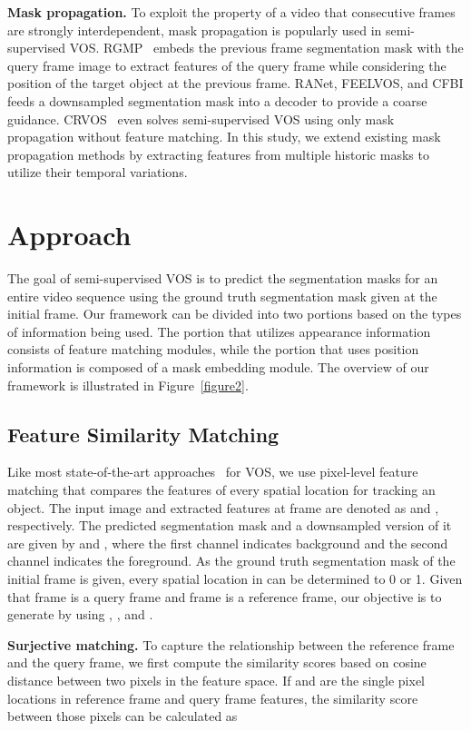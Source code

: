 \documentclass[10pt,twocolumn,letterpaper]{article}
\begin{document}
	
	\vspace{1mm}
	\noindent\textbf{Mask propagation.} To exploit the property of a video that consecutive frames are strongly interdependent, mask propagation is popularly used in semi-supervised VOS. RGMP~\cite{RGMP} embeds the previous frame segmentation mask with the query frame image to extract features of the query frame while considering the position of the target object at the previous frame. RANet, FEELVOS, and CFBI feeds a downsampled segmentation mask into a decoder to provide a coarse guidance. CRVOS~\cite{CRVOS} even solves semi-supervised VOS using only mask propagation without feature matching. In this study, we extend existing mask propagation methods by extracting features from multiple historic masks to utilize their temporal variations. 
	
	
	\section{Approach}
	The goal of semi-supervised VOS is to predict the segmentation masks for an entire video sequence using the ground truth segmentation mask given at the initial frame. Our framework can be divided into two portions based on the types of information being used. The portion that utilizes appearance information consists of feature matching modules, while the portion that uses position information is composed of a mask embedding module. The overview of our framework is illustrated in Figure~\ref{figure2}.
	
	
	\subsection{Feature Similarity Matching}
	\label{feature matching}
	Like most state-of-the-art approaches~\cite{RMNet, LCM, GIEL, SSTVOS} for VOS, we use pixel-level feature matching that compares the features of every spatial location for tracking an object. The input image and extracted features at frame  are denoted as  and , respectively. The predicted segmentation mask and a downsampled version of it are given by  and , where the first channel indicates background and the second channel indicates the foreground. As the ground truth segmentation mask of the initial frame is given, every spatial location in  can be determined to 0 or 1. Given that frame  is a query frame and frame  is a reference frame, our objective is to generate  by using , , and .
	
	\vspace{1mm}
	\noindent\textbf{Surjective matching.} To capture the relationship between the reference frame and the query frame, we first compute the similarity scores based on cosine distance between two pixels in the feature space. If  and  are the single pixel locations in reference frame and query frame features, the similarity score between those pixels can be calculated as
	
\end{document}
